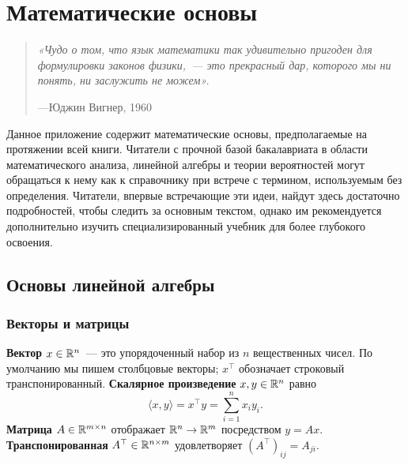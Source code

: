 
\chapter{Математические основы}
\label{app:math}

\begin{quote}
\textit{«Чудо о том, что язык математики так удивительно пригоден для формулировки законов физики,~--- это прекрасный дар, которого мы ни понять, ни заслужить не можем».}
\par\noindent\hfill---Юджин Вигнер, 1960
\end{quote}

\bigskip

Данное приложение содержит математические основы, предполагаемые на протяжении всей книги. Читатели с прочной базой бакалавриата в области математического анализа, линейной алгебры и теории вероятностей могут обращаться к нему как к справочнику при встрече с термином, используемым без определения. Читатели, впервые встречающие эти идеи, найдут здесь достаточно подробностей, чтобы следить за основным текстом, однако им рекомендуется дополнительно изучить специализированный учебник для более глубокого освоения.

\section{Основы линейной алгебры}
\label{app:linalg}

\subsection*{Векторы и матрицы}

\textbf{Вектор} $x \in \mathbb{R}^n$~--- это упорядоченный набор из $n$ вещественных чисел. По умолчанию мы пишем столбцовые векторы; $x^\top$ обозначает строковый транспонированный. \textbf{Скалярное произведение} $x, y \in \mathbb{R}^n$ равно
\[
    \langle x, y \rangle = x^\top y = \sum_{i=1}^n x_i y_i.
\]
\textbf{Матрица} $A \in \mathbb{R}^{m \times n}$ отображает $\mathbb{R}^n \to \mathbb{R}^m$ посредством $y = Ax$. \textbf{Транспонированная} $A^\top \in \mathbb{R}^{n \times m}$ удовлетворяет $(A^\top)_{ij} = A_{ji}$.

